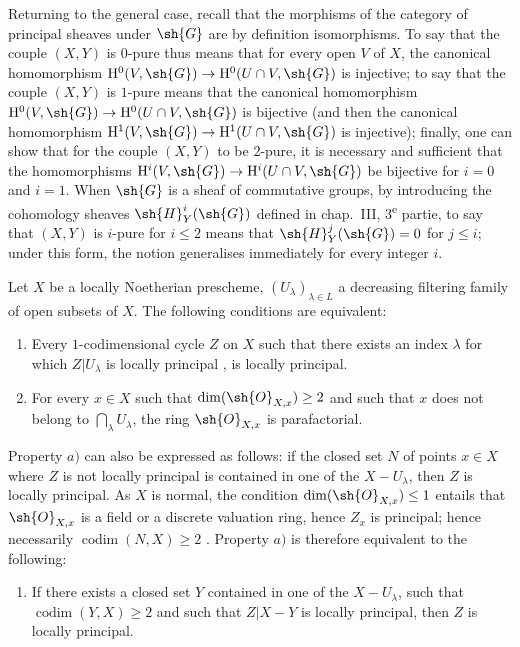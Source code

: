 \begin{remark}[21.13.13]
Returning to the general case, recall that the morphisms of the category of principal sheaves under $\sh{G}$ are by definition isomorphisms.
To say that the couple $(X,Y)$ is $0$-pure thus means that for every open $V$ of $X$, the canonical homomorphism $\mathrm{H}^0(V,\sh{G})\to\mathrm{H}^0(U\cap V,\sh{G})$ is injective; to say that the couple $(X,Y)$ is $1$-pure means that the canonical homomorphism $\mathrm{H}^0(V,\sh{G})\to\mathrm{H}^0(U\cap V,\sh{G})$ is bijective (and then the canonical homomorphism $\mathrm{H}^1(V,\sh{G})\to\mathrm{H}^1(U\cap V,\sh{G})$ is injective); finally, one can show that for the couple $(X,Y)$ to be $2$-pure, it is necessary and sufficient that the homomorphisms $\mathrm{H}^i(V,\sh{G})\to\mathrm{H}^i(U\cap V,\sh{G})$ be bijective for $i=0$ and $i=1$.
When $\sh{G}$ is a sheaf of commutative groups, by introducing the cohomology sheaves $\sh{H}_Y^i(\sh{G})$ defined in chap.~III, 3\textsuperscript{e} partie, to say that $(X,Y)$ is $i$-pure for $i\leq 2$ means that $\sh{H}_Y^j(\sh{G})=0$ for $j\leq i$; under this form, the notion generalises immediately for every integer $i$.
\end{remark}

\begin{proposition}[21.13.14]
\label{IV.21.13.14}
Let $X$ be a locally Noetherian prescheme, $(U_\lambda)_{\lambda\in L}$ a decreasing filtering family of open subsets of $X$.
The following conditions are equivalent:
\begin{enumerate}
  \item[a)] Every $1$-codimensional cycle $Z$ on $X$ such that there exists an index $\lambda$ for which $Z|U_\lambda$ is locally principal , is locally principal.
  \item[b)] For every $x\in X$ such that $\dim(\sh{O}_{X,x})\geq 2$ and such that $x$ does not belong to $\bigcap_\lambda U_\lambda$, the ring $\sh{O}_{X,x}$ is parafactorial.
\end{enumerate}
\end{proposition}


Property $a)$ can also be expressed as follows: if the closed set $N$ of points $x\in X$ where $Z$ is not locally principal is contained in one of the $X-U_\lambda$, then $Z$ is locally principal.
As $X$ is normal, the condition $\dim(\sh{O}_{X,x})\leq 1$ entails that $\sh{O}_{X,x}$ is a field or a discrete valuation ring, hence $Z_x$ is principal; hence necessarily $\operatorname{codim}(N,X)\geq 2$ .
Property $a)$ is therefore equivalent to the following:
\begin{enumerate}
  \item[$a')$] If there exists a closed set $Y$ contained in one of the $X-U_\lambda$, such that $\operatorname{codim}(Y,X)\geq 2$ and such that $Z|X-Y$ is locally principal, then $Z$ is locally principal.
\end{enumerate}

